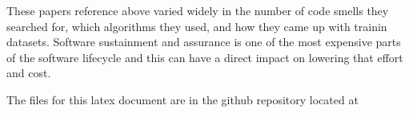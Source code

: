 \documentclass[conference]{IEEEtran}
\begin{document}
These papers reference above varied widely in the number of code smells they searched for, which algorithms they used, and how they came up with trainin datasets.
Software sustainment and assurance is one of the most expensive parts of the software lifecycle\cite{li_progress_2018} and this can have a direct impact on lowering that effort and cost.


The files for this latex document are in the github repository located at 




\end{document}
